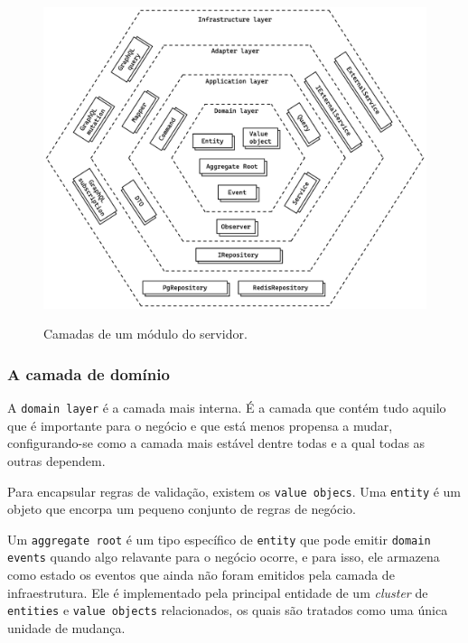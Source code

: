 \begin{figure}[htbp]
	\caption{\small Camadas de um módulo do servidor.}
	\centering
	\includegraphics[width=\textwidth]{../diagrams/out/system_server_each-module_layers.png}
	\label{f.system_server_each-module_layers}
\end{figure}

\FloatBarrier

\subsubsection{A camada de domínio}

A \texttt{domain layer} é a camada mais interna. É a camada que contém tudo aquilo que é importante para o negócio e que está menos propensa a mudar, configurando-se como a camada mais estável dentre todas e a qual todas as outras dependem.

Para encapsular regras de validação, existem os \texttt{value objecs}. Uma \texttt{entity} é um objeto que encorpa um pequeno conjunto de regras de negócio.

Um \texttt{aggregate root} é um tipo específico de \texttt{entity} que pode emitir \texttt{domain events} quando algo relavante para o negócio ocorre, e para isso, ele armazena como estado os eventos que ainda não foram emitidos pela camada de infraestrutura. Ele é implementado pela principal entidade de um \emph{cluster} de \texttt{entities} e \texttt{value objects} relacionados, os quais são tratados como uma única unidade de mudança.

